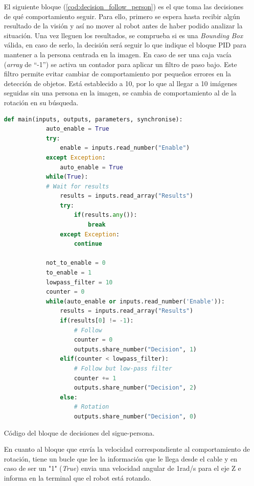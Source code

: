 El siguiente bloque (\ref{cod:decision_follow_person}) es el que toma las decisiones de qué comportamiento seguir.
Para ello, primero se espera hasta recibir algún resultado de la visión y así no mover al robot antes de haber podido analizar la situación.
Una vez lleguen los resultados, se comprueba si es una \textit{Bounding Box} válida, en caso de serlo, la decisión será seguir lo que indique
el bloque PID para mantener a la persona centrada en la imagen.
En caso de ser una caja vacía (\textit{array} de ``-1'') se activa un contador para aplicar un filtro de paso bajo.
Este filtro permite evitar cambiar de comportamiento por pequeños errores en la detección de objetos.
Está establecido a 10, por lo que al llegar a 10 imágenes seguidas sin una persona en la imagen, se cambia de comportamiento al de la rotación
en su búsqueda.

\begin{code}[H]
    \begin{lstlisting}[language=python]
        def main(inputs, outputs, parameters, synchronise):
            auto_enable = True
            try:
                enable = inputs.read_number("Enable")
            except Exception:
                auto_enable = True
            while(True):
            # Wait for results
                results = inputs.read_array("Results")
                try:
                    if(results.any()):
                        break
                except Exception:
                    continue
    
            not_to_enable = 0
            to_enable = 1
            lowpass_filter = 10
            counter = 0
            while(auto_enable or inputs.read_number('Enable')):
                results = inputs.read_array("Results")
                if(results[0] != -1):
                    # Follow
                    counter = 0
                    outputs.share_number("Decision", 1)
                elif(counter < lowpass_filter):
                    # Follow but low-pass filter
                    counter += 1
                    outputs.share_number("Decision", 2)
                else:
                    # Rotation
                    outputs.share_number("Decision", 0)
    \end{lstlisting}
    \caption[Código bloque decisión sigue-persona]{Código del bloque de decisiones del sigue-persona.}
    \label{cod:decision_follow_person}
\end{code}

En cuanto al bloque que envía la velocidad correspondiente al comportamiento de rotación, tiene un bucle que lee la información que le llega
desde el cable y en caso de ser un "1" (\textit{True}) envia una velocidad angular de 1rad/s para el eje Z e informa en la terminal que el robot está rotando.

